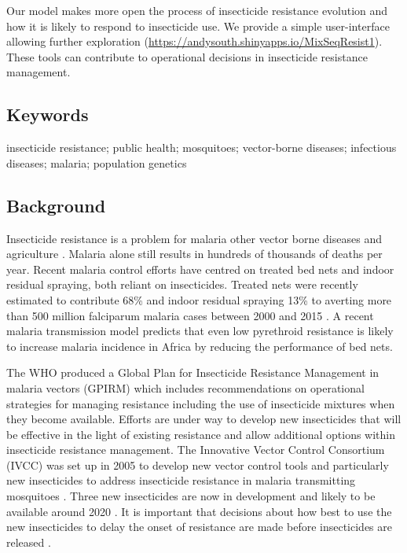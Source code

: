 \documentclass[11pt,]{article}
\begin{document}
Our model makes more open the process of insecticide resistance
evolution and how it is likely to respond to insecticide use. We provide
a simple user-interface allowing further exploration
(\url{https://andysouth.shinyapps.io/MixSeqResist1}). These tools can
contribute to operational decisions in insecticide resistance
management.

\subsection{Keywords}\label{keywords}

insecticide resistance; public health; mosquitoes; vector-borne
diseases; infectious diseases; malaria; population genetics

\subsection{Background}\label{background-1}

Insecticide resistance is a problem for malaria
\citep{WHO2012}\citep{Ranson2016}\citep{Hemingway2016} other vector
borne diseases \citep{IRAC2011} and agriculture \citep{FAO2012}. Malaria
alone still results in hundreds of thousands of deaths per year. Recent
malaria control efforts have centred on treated bed nets and indoor
residual spraying, both reliant on insecticides. Treated nets were
recently estimated to contribute 68\% and indoor residual spraying 13\%
to averting more than 500 million falciparum malaria cases between 2000
and 2015 \citep{Bhatt2015}. A recent malaria transmission model
\citep{Churcher2016} predicts that even low pyrethroid resistance is
likely to increase malaria incidence in Africa by reducing the
performance of bed nets.

The WHO produced a Global Plan for Insecticide Resistance Management in
malaria vectors (GPIRM)\citep{WHO2012} which includes recommendations on
operational strategies for managing resistance including the use of
insecticide mixtures when they become available. Efforts are under way
to develop new insecticides that will be effective in the light of
existing resistance and allow additional options within insecticide
resistance management. The Innovative Vector Control Consortium (IVCC)
was set up in 2005 to develop new vector control tools and particularly
new insecticides to address insecticide resistance in malaria
transmitting mosquitoes \citep{Hemingway2006}\citep{IVCC2016}. Three new
insecticides are now in development \citep{IVCC2016} and likely to be
available around 2020 \citep{Ranson2016}. It is important that decisions
about how best to use the new insecticides to delay the onset of
resistance are made before insecticides are released
\citep{Hemingway2016}.
\end{document}
